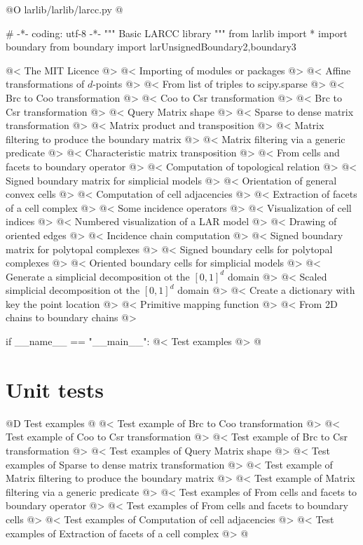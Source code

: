 \documentclass[11pt,oneside]{article}    %
\begin{document}
@O larlib/larlib/larcc.py
@{# -*- coding: utf-8 -*-
""" Basic LARCC library """
from larlib import *
import boundary
from boundary import larUnsignedBoundary2,boundary3

@< The MIT Licence @>
@< Importing of modules or packages @>
@< Affine transformations of $d$-points @>
@< From list of triples to scipy.sparse @>
@< Brc to Coo transformation @>
@< Coo to Csr transformation @>
@< Brc to Csr transformation @>
@< Query Matrix shape @>
@< Sparse to dense matrix transformation @>
@< Matrix product and transposition @>
@< Matrix filtering to produce the boundary matrix @>
@< Matrix filtering via a generic predicate @>
@< Characteristic matrix transposition @>
@< From cells and facets to boundary operator @>
@< Computation of topological relation @>
@< Signed boundary matrix for simplicial models @>
@< Orientation of general convex cells @>
@< Computation of cell adjacencies @>
@< Extraction of facets of a cell complex @>
@< Some incidence operators @>
@< Visualization of cell indices @>
@< Numbered visualization of a LAR model @>
@< Drawing of oriented edges @>
@< Incidence chain computation @>
@< Signed boundary matrix for polytopal complexes @>
@< Signed boundary cells for polytopal complexes @>
@<  Oriented boundary cells for simplicial models @>
@< Generate a simplicial decomposition ot the $[0,1]^d$ domain @>
@< Scaled simplicial decomposition ot the $[0,1]^d$ domain @>
@< Create a dictionary with key the point location @>
@< Primitive mapping function @>
@< From 2D chains to boundary chains @>


if __name__ == "__main__": 
    @< Test examples @>
@}

\section{Unit tests}

@D Test examples
@{
@< Test example of Brc to Coo transformation @>
@< Test example of Coo to Csr transformation @>
@< Test example of Brc to Csr transformation @>
@< Test examples of Query Matrix shape @>
@< Test examples of Sparse to dense matrix transformation @>
@< Test example of Matrix filtering to produce the boundary matrix @>
@< Test example of Matrix filtering via a generic predicate @>
@< Test examples of From cells and facets to boundary operator @>
@< Test examples of From cells and facets to boundary cells @>
@< Test examples of Computation of cell adjacencies @>
@< Test examples of Extraction of facets of a cell complex @>
@}
\end{document}
